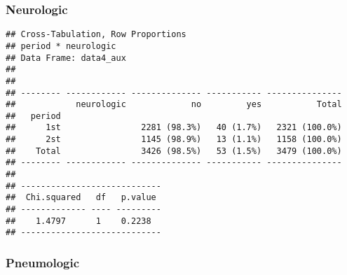 \documentclass[
]{article}
\newenvironment{Shaded}{\begin{snugshade}}{\end{snugshade}}
\newcommand{\DataTypeTok}[1]{\textcolor[rgb]{0.13,0.29,0.53}{#1}}
\newcommand{\KeywordTok}[1]{\textcolor[rgb]{0.13,0.29,0.53}{\textbf{#1}}}
\newcommand{\NormalTok}[1]{#1}
\newcommand{\OperatorTok}[1]{\textcolor[rgb]{0.81,0.36,0.00}{\textbf{#1}}}
\newcommand{\OtherTok}[1]{\textcolor[rgb]{0.56,0.35,0.01}{#1}}
\newcommand{\StringTok}[1]{\textcolor[rgb]{0.31,0.60,0.02}{#1}}
\begin{document}
\hypertarget{neurologic-2}{%
\subsubsection{Neurologic}\label{neurologic-2}}

\begin{Shaded}
\end{Shaded}

\begin{verbatim}
## Cross-Tabulation, Row Proportions  
## period * neurologic  
## Data Frame: data4_aux  
## 
## 
## -------- ------------ -------------- ----------- ---------------
##            neurologic             no         yes           Total
##   period                                                        
##      1st                2281 (98.3%)   40 (1.7%)   2321 (100.0%)
##      2st                1145 (98.9%)   13 (1.1%)   1158 (100.0%)
##    Total                3426 (98.5%)   53 (1.5%)   3479 (100.0%)
## -------- ------------ -------------- ----------- ---------------
## 
## ----------------------------
##  Chi.squared   df   p.value 
## ------------- ---- ---------
##    1.4797      1    0.2238  
## ----------------------------
\end{verbatim}

\hypertarget{pneumologic-2}{%
\subsubsection{Pneumologic}\label{pneumologic-2}}

\begin{Shaded}
\end{Shaded}
\end{document}
